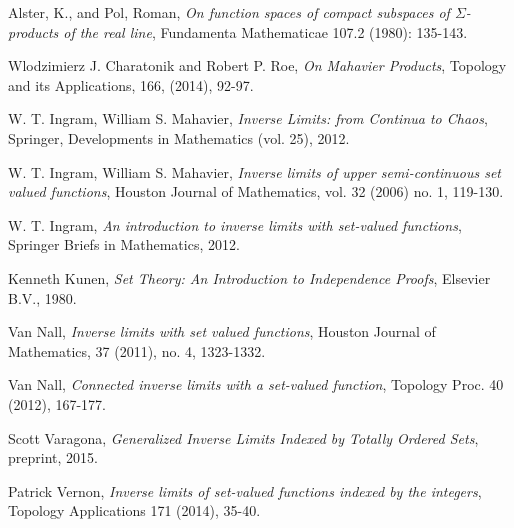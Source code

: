 \documentclass{amsart}
\theoremstyle{definition}
\newcommand{\<}{\langle}
\renewcommand{\>}{\rangle}
\begin{document}

\begin{thebibliography}{10}

\smallskip

 Alster, K., and Pol, Roman, \textit{On function spaces of compact subspaces of $\Sigma$-products of the real line}, Fundamenta Mathematicae 107.2 (1980): 135-143.

\smallskip

 Wlodzimierz J. Charatonik and Robert P. Roe, {\it On Mahavier Products}, Topology and its Applications,
166, (2014), 92-97.

\smallskip

 W. T. Ingram, William S. Mahavier, {\it Inverse Limits: from Continua to Chaos}, Springer, Developments in Mathematics (vol. 25), 2012.

\smallskip

 W. T. Ingram, William S. Mahavier, {\it Inverse limits of upper semi-continuous set valued functions}, Houston Journal of Mathematics, vol. 32 (2006) no. 1, 119-130.

\smallskip

 W. T. Ingram, {\it An introduction to inverse limits with set-valued functions}, Springer Briefs in Mathematics, 2012.

\smallskip

 Kenneth Kunen, {\it Set Theory: An Introduction to Independence Proofs}, Elsevier B.V., 1980.

\smallskip

 Van Nall, {\it Inverse limits with set valued functions}, Houston Journal of Mathematics, 37 (2011), no. 4, 1323-1332.

\smallskip

 Van Nall, {\it Connected inverse limits with a set-valued function}, Topology Proc. 40 (2012), 167-177.

\smallskip

 Scott Varagona, {\it Generalized Inverse Limits Indexed by Totally Ordered Sets}, preprint, 2015.

\smallskip

 Patrick Vernon, {\it Inverse limits of set-valued functions indexed by the integers}, Topology Applications 171 (2014), 35-40.
\end{thebibliography}
\end{document}
